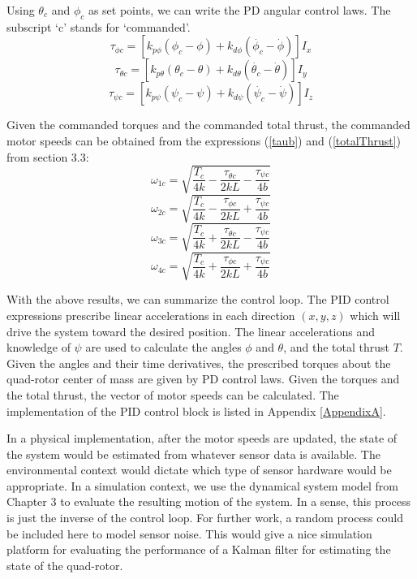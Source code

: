 Using $\theta_c$ and $\phi_c$ as set points, we can write the PD angular control laws. The subscript `c' stands for `commanded'.
\begin{equation}
    \tau_{\phi c} = [ k_{p\phi} (\phi_c - \phi) + k_{d\phi} (\dot{\phi_c} - \dot{\phi}) ] I_x
\end{equation}
\begin{equation}
    \tau_{\theta c} = [ k_{p\theta} (\theta_c - \theta) + k_{d\theta} (\dot{\theta_c} - \dot{\theta}) ] I_y
\end{equation}
\begin{equation}
    \tau_{\psi c} = [ k_{p\psi} (\psi_c - \psi) + k_{d\psi} (\dot{\psi_c} - \dot{\psi}) ] I_z
\end{equation}

Given the commanded torques and the commanded total thrust, the commanded motor speeds can be obtained from the expressions (\ref{taub}) and (\ref{totalThrust}) from section 3.3:
\begin{equation}
    \omega_{1c} = \sqrt{ \frac{T_c}{4 k} - \frac{ \tau_{\theta c}}{2 k L} - \frac{ \tau_{\psi c} }{4 b } }
\end{equation}
\begin{equation}
    \omega_{2c} = \sqrt{ \frac{T_c}{4 k} - \frac{ \tau_{\phi c}}{2 k L}   + \frac{ \tau_{\psi c} }{4 b } }
\end{equation}
\begin{equation}
    \omega_{3c} = \sqrt{ \frac{T_c}{4 k} + \frac{ \tau_{\theta c}}{2 k L} - \frac{ \tau_{\psi c} }{4 b } }
\end{equation}
\begin{equation}
    \omega_{4c} = \sqrt{ \frac{T_c}{4 k} + \frac{ \tau_{\phi c}}{2 k L}   + \frac{ \tau_{\psi c} }{4 b } }
\end{equation}


With the above results, we can summarize the control loop. The PID control expressions prescribe linear accelerations in each direction $(x,y,z)$ which will drive the system toward the desired position. The linear accelerations and knowledge of $\psi$ are used to calculate the angles $\phi$ and $\theta$, and the total thrust $T$. Given the angles and their time derivatives, the prescribed torques about the quad-rotor center of mass are given by PD control laws. Given the torques and the total thrust, the vector of motor speeds can be calculated. The implementation of the PID control block is listed in Appendix \ref{AppendixA}.

In a physical implementation, after the motor speeds are updated, the state of the system would be estimated from whatever sensor data is available. The environmental context would dictate which type of sensor hardware would be appropriate. In a simulation context, we use the dynamical system model from Chapter 3 to evaluate the resulting motion of the system. In a sense, this process is just the inverse of the control loop. For further work, a random process could be included here to model sensor noise. This would give a nice simulation platform for evaluating the performance of a Kalman filter for estimating the state of the quad-rotor.


